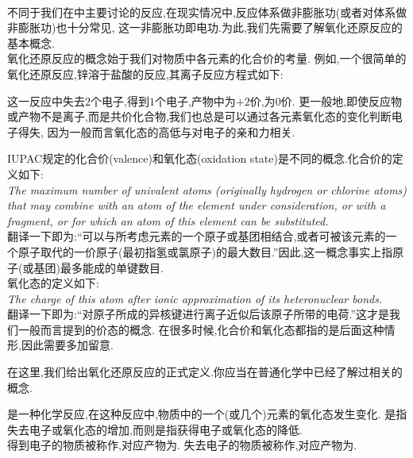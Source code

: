 \documentclass{ctexart}
\begin{document}
\pagestyle{plain}
\noindent{}\vspace{15pt}\\
\indent 不同于我们在中主要讨论的反应,在现实情况中,反应体系做非膨胀功(或者对体系做非膨胀功)也十分常见,%
这一非膨胀功即电功.为此,我们先需要了解氧化还原反应的基本概念.\vspace{12pt}\\
\indent 氧化还原反应的概念始于我们对物质中各元素的化合价的考量.%
例如,一个很简单的氧化还原反应,锌溶于盐酸的反应,其离子反应方程式如下:
\begin{tightcenter}
\end{tightcenter}
这一反应中失去$2$个电子,得到$1$个电子,产物中为$+2$价,为$0$价.%
更一般地,即使反应物或产物不是离子,而是共价化合物,我们也总是可以通过各元素氧化态的变化判断电子得失,%
因为一般而言氧化态的高低与对电子的亲和力相关.
\begin{hint}
    IUPAC规定的化合价(valence)和氧化态(oxidation state)是不同的概念.化合价的定义如下:\\
    \textit{The maximum number of univalent atoms (originally hydrogen or chlorine atoms) that may combine with an atom of the element under consideration, or with a fragment, or for which an atom of this element can be substituted.}\\
    翻译一下即为:“可以与所考虑元素的一个原子或基团相结合,或者可被该元素的一个原子取代的一价原子(最初指氢或氯原子)的最大数目.”因此,这一概念事实上指原子(或基团)最多能成的单键数目.\\
    氧化态的定义如下:\\
    \textit{The charge of this atom after ionic approximation of its heteronuclear bonds.}\\
    翻译一下即为:“对原子所成的异核键进行离子近似后该原子所带的电荷.”这才是我们一般而言提到的价态的概念.%
    在很多时候,化合价和氧化态都指的是后面这种情形,因此需要多加留意.
\end{hint}
\indent 在这里,我们给出氧化还原反应的正式定义.你应当在普通化学中已经了解过相关的概念.
\begin{definition}[6A.1.1 氧化还原反应]
    是一种化学反应,在这种反应中,物质中的一个(或几个)元素的氧化态发生变化.%
    是指失去电子或氧化态的增加,而则是指获得电子或氧化态的降低.\\
    得到电子的物质被称作,对应产物为.%
    失去电子的物质被称作,对应产物为.
\end{definition}
\end{document}
